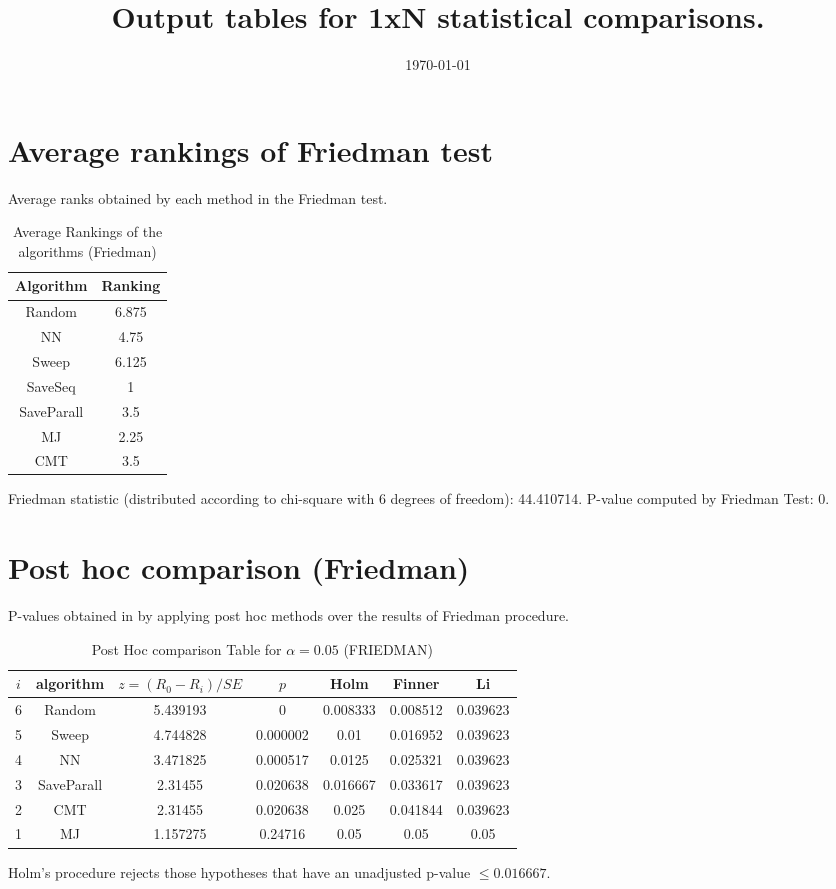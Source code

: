 \documentclass[a4paper,10pt]{article}
\title{Output tables for 1xN statistical comparisons.}
\author{}
\date{\today}
\begin{document}
\begin{landscape}
\pagestyle{empty}
\maketitle
\thispagestyle{empty}

\section{Average rankings of Friedman test}


Average ranks obtained by each method in the Friedman test.

\begin{table}[!htp]
\centering
\begin{tabular}{|c|c|}\hline
Algorithm&Ranking\\\hline
Random&6.875\\NN&4.75\\Sweep&6.125\\SaveSeq&1\\SaveParall&3.5\\MJ&2.25\\CMT&3.5\\\hline\end{tabular}
\caption{Average Rankings of the algorithms (Friedman)}
\end{table}

Friedman statistic (distributed according to chi-square with 6 degrees of freedom): 44.410714. \newline P-value computed by Friedman Test: 0.\newline


\newpage

\section{Post hoc comparison (Friedman)}


P-values obtained in by applying post hoc methods over the results of Friedman procedure.

\begin{table}[!htp]
\centering\footnotesize
\begin{tabular}{ccccccc}
$i$&algorithm&$z=(R_0 - R_i)/SE$&$p$&Holm &Finner&Li\\
\hline6&Random&5.439193&0&0.008333&0.008512&0.039623\\5&Sweep&4.744828&0.000002&0.01&0.016952&0.039623\\4&NN&3.471825&0.000517&0.0125&0.025321&0.039623\\3&SaveParall&2.31455&0.020638&0.016667&0.033617&0.039623\\2&CMT&2.31455&0.020638&0.025&0.041844&0.039623\\1&MJ&1.157275&0.24716&0.05&0.05&0.05\\\hline
\end{tabular}
\caption{Post Hoc comparison Table for $\alpha=0.05$ (FRIEDMAN)}
\end{table}Holm's procedure rejects those hypotheses that have an unadjusted p-value $\le0.016667$.


\end{landscape}
\end{document}
